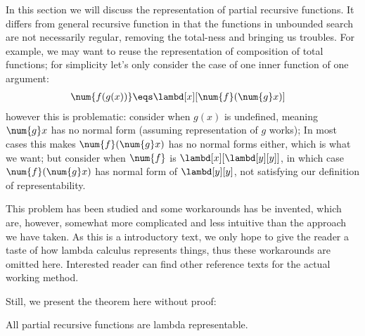 \documentclass[../../../include/open-logic-section]{subfiles}
\begin{document}

In this section we will discuss the representation of partial
recursive functions. It differs from general recursive function in
that the functions in unbounded search are not necessarily
regular, removing the total-ness and bringing us troubles. For example, we may want to
reuse the representation of composition of total
functions; for simplicity let's only consider the case of one inner
function of one argument:
\begin{align*}
  \num{f(g(x))} &\eqs \lambd[x][\num{f} (\num{g} x)]
\end{align*}
however this is problematic: consider when $g(x)$ is
undefined, meaning $\num{g} x$ has no normal
form (assuming representation of $g$ works); In most cases this makes
$\num{f} (\num{g} x)$ has no normal forms either, which is what we want; but consider when
$\num{f}$ is $\lambd[x][\lambd[y][y]]$, in which case $\num{f}
(\num{g} x)$ has normal form of $\lambd[y][y]$, not
satisfying our definition of representability.

This problem has been studied and some workarounds has be invented, 
which are, however, somewhat more complicated and less intuitive than the
approach we have taken. As this is a introductory text, we only hope to
give the reader a taste of how lambda calculus represents things, thus
these workarounds are omitted here. Interested reader can find other
reference texts for the actual working method.

Still, we present the theorem here without proof:
\begin{thm}
  All partial recursive functions are lambda representable.
\end{thm}
\end{document}
